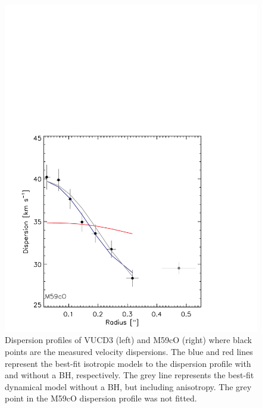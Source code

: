 \documentclass{aastex}
\begin{document}
\begin{figure}[ht!]
\begin{minipage}{0.48\textwidth}
    \includegraphics[trim={0 0 0 10cm},clip,scale=0.5]{m59co_onedbestfit.pdf}%
  \end{minipage}
    
  \caption{Dispersion profiles of VUCD3 (left) and M59cO (right) where black points are the measured velocity dispersions. The blue and red lines represent the best-fit isotropic models to the dispersion profile with and without a BH, respectively. The grey line represents the best-fit dynamical model without a BH, but including anisotropy. The grey point in the M59cO dispersion profile was not fitted.}
  
  \label{fig:oneddisp}
\end{figure}
\end{document}
